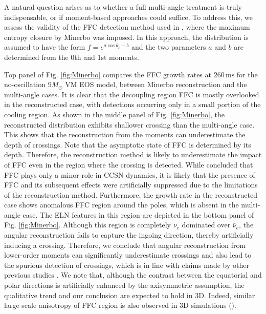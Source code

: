 \documentclass[
reprint,
superscriptaddress,
amsmath,amssymb,
aps,
prl
]{revtex4-2}
\begin{document}
A natural question arises as to whether a full multi-angle treatment is truly indispensable, or if moment-based approaches could suffice. To address this, we assess the validity of the FFC detection method used in \cite{Wang2025ApJ...986..153W}, where the maximum entropy closure by Minerbo \cite{Minerbo1978JQSRT..20..541M} was imposed.
In this approach, the distribution is assumed to have the form $f=e^{a\cos\theta_\nu-b}$ and the two parameters $a$ and $b$ are determined from the 0th and 1st moments.


Top panel of Fig. \ref{fig:Minerbo} compares the FFC growth rates at $260\,\mathrm{ms}$ for the no-oscillation $9M_\odot$ VM EOS model, between Minerbo reconstruction and the multi-angle cases.
It is clear that the decoupling region FFC is mostly overlooked in the reconstructed case, with detections occurring only in a small portion of the cooling region.
As shown in the middle panel of Fig. \ref{fig:Minerbo}, the reconstructed distribution exhibits shallower crossing than the multi-angle case.
This shows that the reconstruction from the moments can underestimate the depth of crossings.
Note that the asymptotic state of FFC is determined by its depth. Therefore, the reconstruction method is likely to underestimate the impact of FFC even in the region where the crossing is detected.
While \cite{Wang2025ApJ...986..153W} concluded that FFC plays only a minor role in CCSN dynamics, it is likely that the presence of FFC and its subsequent effects were artificially suppressed due to the limitations of the reconstruction method.
Furthermore, the growth rate in the reconstructed case shows anomalous FFC region around the poles, which is absent in the multi-angle case.
The ELN features in this region are depicted in the bottom panel of Fig. \ref{fig:Minerbo}.
Although this region is completely $\nu_e$ dominated over $\bar\nu_e$, the angular reconstruction fails to capture the ingoing direction, thereby artificially inducing a crossing.
Therefore, we conclude that angular reconstruction from lower-order moments can significantly underestimate crossings and also lead to the spurious detection of crossings, which is in line with claims made by other previous studies \cite{Nagakura2021PhRvD.104f3014N,Nagakura2021PhRvD.104h3025N,Johns2021PhRvD.103l3012J,Cornelius2025PhRvD.112f3004C}. We note that, although the contrast between the equatorial and polar directions is artificially enhanced by the axisymmetric assumption, the qualitative trend and our conclusion are expected to hold in 3D. Indeed, similar large-scale anisotropy of FFC region is also observed in 3D simulations (\cite{Nagakura2021PhRvD.104h3025N,Abbar2021PhRvD.103f3033A}).
\end{document}
